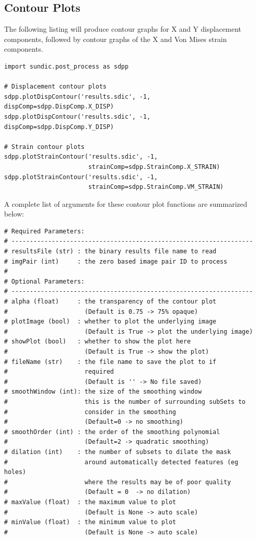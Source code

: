 \subsection{Contour Plots}

The following listing will produce contour graphs for X and Y displacement components, followed by contour graphs of the X and Von Mises strain components.

\begin{lstlisting}
import sundic.post_process as sdpp

# Displacement contour plots
sdpp.plotDispContour('results.sdic', -1, dispComp=sdpp.DispComp.X_DISP)
sdpp.plotDispContour('results.sdic', -1, dispComp=sdpp.DispComp.Y_DISP)

# Strain contour plots
sdpp.plotStrainContour('results.sdic', -1,
                       strainComp=sdpp.StrainComp.X_STRAIN)
sdpp.plotStrainContour('results.sdic', -1,
                       strainComp=sdpp.StrainComp.VM_STRAIN)
\end{lstlisting}

\newpage
\noindent
A complete list of arguments for these contour plot functions are summarized below:

\begin{lstlisting}
# Required Parameters:
# ------------------------------------------------------------------
# resultsFile (str) : the binary results file name to read
# imgPair (int)     : the zero based image pair ID to process
# 
# Optional Parameters:
# ------------------------------------------------------------------
# alpha (float)     : the transparency of the contour plot
#                     (Default is 0.75 -> 75% opaque)
# plotImage (bool)  : whether to plot the underlying image
#                     (Default is True -> plot the underlying image)
# showPlot (bool)   : whether to show the plot here
#                     (Default is True -> show the plot)
# fileName (str)    : the file name to save the plot to if 
#                     required
#                     (Default is '' -> No file saved)
# smoothWindow (int): the size of the smoothing window
#                     this is the number of surrounding subSets to 
#                     consider in the smoothing 
#                     (Default=0 -> no smoothing)
# smoothOrder (int) : the order of the smoothing polynomial 
#                     (Default=2 -> quadratic smoothing)
# dilation (int)    : the number of subsets to dilate the mask 
#                     around automatically detected features (eg holes) 
#                     where the results may be of poor quality 
#                     (Default = 0  -> no dilation)
# maxValue (float)  : the maximum value to plot
#                     (Default is None -> auto scale)
# minValue (float)  : the minimum value to plot
#                     (Default is None -> auto scale)
\end{lstlisting}

